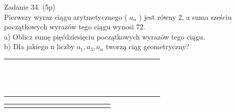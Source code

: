 \documentclass[10pt]{article}
\begin{document}
Zadanie 34. (5p)\\
Pierwszy wyraz ciągu arytmetycznego ( \(a_{n}\) ) jest równy 2, a suma sześciu początkowych wyrazów tego ciągu wynosi 72.\\
a) Oblicz sumę pięćdziesięciu początkowych wyrazów tego ciągu.\\
b) Dla jakiego n liczby \(a_{1}, a_{3}, a_{n}\) tworzą ciąg geometryczny?

\begin{center}
\begin{tabular}{|c|c|c|c|c|c|c|c|c|c|c|c|c|c|c|c|c|c|c|c|c|c|}
\hline
 &  &  &  &  &  &  &  &  &  &  &  &  &  &  &  &  &  &  &  &  &  \\
\hline
 &  &  &  &  &  &  &  &  &  &  &  &  &  &  &  &  &  &  &  &  &  \\
\hline
 &  &  &  &  &  &  &  &  &  &  &  &  &  &  &  &  &  &  &  &  &  \\
\hline
 &  &  &  &  &  &  &  &  &  &  &  &  &  &  &  &  &  &  &  &  &  \\
\hline
 &  &  &  &  &  &  &  &  &  &  &  &  &  &  &  &  &  &  &  &  &  \\
\hline
 &  &  &  &  &  &  &  &  &  &  &  &  &  &  &  &  &  &  &  &  &  \\
\hline
 &  &  &  &  &  &  &  &  &  &  &  &  &  &  &  &  &  &  &  &  &  \\
\hline
 &  &  &  &  &  &  &  &  &  &  &  &  &  &  &  &  &  &  &  &  &  \\
\hline
 &  &  &  &  &  &  &  &  &  &  &  &  &  &  &  &  &  &  &  &  &  \\
\hline
 &  &  &  &  &  &  &  &  &  &  &  &  &  &  &  &  &  &  &  &  &  \\
\hline
 &  &  &  &  &  &  &  &  &  &  &  &  &  &  &  &  &  &  &  &  &  \\
\hline
 &  &  &  &  &  &  &  &  &  &  &  &  &  &  &  &  &  &  &  &  &  \\
\hline
 &  &  &  &  &  &  &  &  &  &  &  &  &  &  &  &  &  &  &  &  &  \\
\hline
 &  &  &  &  &  &  &  &  &  &  &  &  &  &  &  &  &  &  &  &  &  \\
\hline
 &  &  &  &  &  &  &  &  &  &  &  &  &  &  &  &  &  &  &  &  &  \\
\hline
\end{tabular}
\end{center}

\begin{center}
\begin{tabular}{l|l|l|l|l|l|l|l|l|l|l|l|l|l|l|}
 &  &  &  &  \\
\hline
 &  &  &  &  \\
\hline
\end{tabular}
\end{center}
\end{document}
